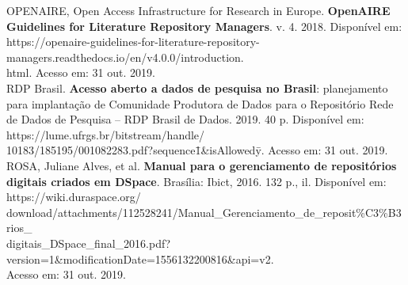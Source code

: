\documentclass[12pt,hidelinks]{article}
\begin{document}
\noindent OPENAIRE, Open Access Infrastructure for Research in Europe. \textbf{OpenAIRE Guidelines for Literature Repository Managers}. v. 4. 2018. Disponível em: https://openaire-guidelines-for-literature-repository-managers.readthedocs.io/en/v4.0.0/introduction.\\html. Acesso em: 31 out. 2019.\\

\noindent RDP Brasil. \textbf{Acesso aberto a dados de pesquisa no Brasil}: planejamento para implantação de Comunidade Produtora de Dados para o Repositório Rede de Dados de Pesquisa – RDP Brasil de Dados. 2019. 40 p. Disponível em: https://lume.ufrgs.br/bitstream/handle/\\10183/185195/001082283.pdf?sequence\=1\&isAllowed\=y. Acesso em: 31 out. 2019.\\

\noindent ROSA, Juliane Alves, et al. \textbf{Manual para o gerenciamento de repositórios digitais criados em DSpace}. Brasília: Ibict, 2016. 132 p., il. Disponível em: https://wiki.duraspace.org/\\download/attachments/112528241/Manual\_Gerenciamento\_de\_reposit\%C3\%B3rios\_\\digitais\_DSpace\_final\_2016.pdf?version=1\&modificationDate=1556132200816\&api=v2. \\Acesso em: 31 out. 2019.\\
\end{document}
